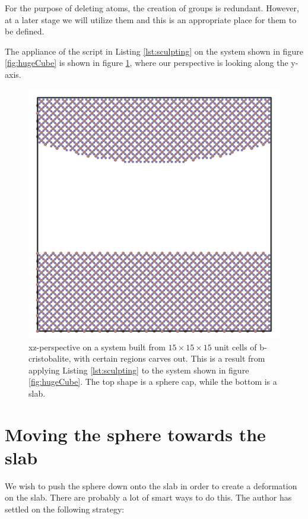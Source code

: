 \documentclass[twoside,english]{uiofysmaster}
\begin{document}


For the purpose of deleting atoms, the creation of groups is redundant. However, at a later stage we will utilize them and this is an appropriate place for them to be defined.

The appliance of the script in Listing \ref{lst:sculpting} on the system shown in figure \ref{fig:hugeCube} is shown in figure \ref{fig:carvedxz}, where our perspective is looking along the y-axis.

\begin{figure}[H]
\centering
\includegraphics[width=0.7\linewidth]{figures/CreatingSystem/carved_xz.png}
\caption{xz-perspective on a system built from $15\times15\times15$ unit cells of b-cristobalite, with certain regions carves out. This is a result from applying Listing \ref{lst:sculpting} to the system shown in figure \ref{fig:hugeCube}. The top shape is a sphere cap, while the bottom is a slab.}
\label{fig:carvedxz}
\end{figure}


\section{Moving the sphere towards the slab}
We wish to push the sphere down onto the slab in order to create a deformation on the slab. There are probably a lot of smart ways to do this. The author has settled on the following strategy:
\end{document}
